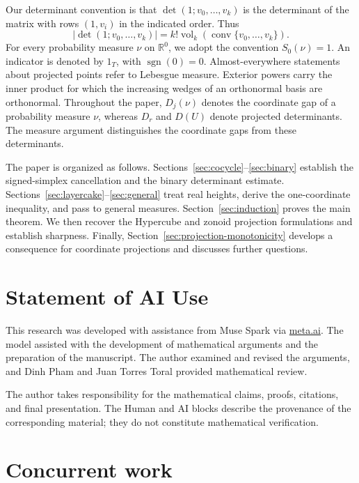 \documentclass[11pt]{article}
\theoremstyle{remark}
\newcommand{\R}{\mathbb{R}}
\newcommand{\vol}{\operatorname{vol}}
\newcommand{\conv}{\operatorname{conv}}
\newcommand{\sgn}{\operatorname{sgn}}
\newcommand{\one}{1}
\begin{document}
\begin{humanblock}
Our determinant convention is that $\det(1;v_0,\ldots,v_k)$ is the determinant of the matrix with rows $(1,v_i)$ in the indicated order. Thus
$$|\det(1;v_0,\ldots,v_k)|=k!\vol_k(\conv\{v_0,\ldots,v_k\}).$$
For every probability measure $\nu$ on $\R^0$, we adopt the convention $S_0(\nu)=1$. An indicator is denoted by $\one_T$, with $\sgn(0)=0$. Almost-everywhere statements about projected points refer to Lebesgue measure. Exterior powers carry the inner product for which the increasing wedges of an orthonormal basis are orthonormal. Throughout the paper, $D_j(\nu)$ denotes the coordinate gap of a probability measure $\nu$, whereas $D_r$ and $D(U)$ denote projected determinants. The measure argument distinguishes the coordinate gaps from these determinants.

The paper is organized as follows. Sections~\ref{sec:cocycle}--\ref{sec:binary} establish the signed-simplex cancellation and the binary determinant estimate. Sections~\ref{sec:layercake}--\ref{sec:general} treat real heights,
derive the one-coordinate inequality, and pass to general measures. Section~\ref{sec:induction} proves the main theorem. We then recover the Hypercube and zonoid projection formulations and establish sharpness. Finally, Section~\ref{sec:projection-monotonicity} develops a consequence for coordinate projections and discusses further questions.


\end{humanblock}

\section*{Statement of AI Use}

\begin{humanblock}


This research was developed with assistance from Muse Spark via \href{https://meta.ai}{meta.ai}. The model assisted with the development of mathematical arguments and the preparation of the manuscript. The author examined and revised the arguments, and Dinh Pham and Juan Torres Toral provided mathematical review.

The author takes responsibility for the mathematical claims, proofs, citations, and final presentation. The Human and AI blocks describe the provenance of the corresponding material; they do not constitute mathematical verification.
\end{humanblock}

\section*{Concurrent work}
\end{document}
